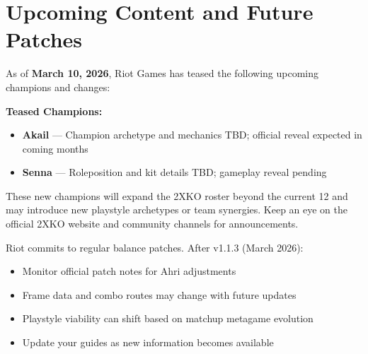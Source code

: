 \documentclass[12pt, a4paper]{report}
\newcommand{\faLightbulb}{\ding{72}}
\newcommand{\faExclamationTriangle}{\ding{52}}
\newcommand{\champ}[1]{\textcolor{ahriAccent}{\textbf{#1}}}
\begin{document}
\clearpage

\section{Upcoming Content and Future Patches}

As of \textcolor{ahriGold}{\textbf{March 10, 2026}}, Riot Games has teased the following upcoming champions and changes:

\begin{tipbox}[title={\faLightbulb\enspace HORIZON PREVIEW}]
\textbf{Teased Champions:}
\begin{itemize}[itemsep=3pt]
  \item \champ{Akail} --- Champion archetype and mechanics TBD; official reveal expected in coming months
  \item \champ{Senna} --- Roleposition and kit details TBD; gameplay reveal pending
\end{itemize}

These new champions will expand the 2XKO roster beyond the current 12 and may introduce new playstyle archetypes or team synergies. Keep an eye on the official 2XKO website and community channels for announcements.
\end{tipbox}

\begin{warnbox}[title={\faExclamationTriangle\enspace BALANCE PATCH SCHEDULE}]
Riot commits to regular balance patches. After v1.1.3 (March 2026):
\begin{itemize}[itemsep=3pt]
  \item Monitor official patch notes for Ahri adjustments
  \item Frame data and combo routes may change with future updates
  \item Playstyle viability can shift based on matchup metagame evolution
  \item Update your guides as new information becomes available
\end{itemize}
\end{warnbox}

\vfill
\end{document}
